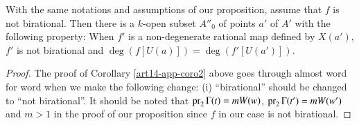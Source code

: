 \begin{corollary}\label{art14-app-coro4}
With the same notations and assumptions of our proposition, assume that $f$ is not birational. Then there is a $k$-open subset $A''_{0}$ of points $a'$ of $A'$ with the following property: When $f'$ is a non-degenerate rational map defined by $X(a')$, $f'$ is not birational and $\deg (f[U(a)])=\deg(f'[U(a')])$.
\end{corollary}

\begin{proof}
The proof of Corollary \ref{art14-app-coro2} above goes through almost word for word when we make the following change: (i) ``birational'' should be changed to ``not birational''. It should be noted that $\operatorname{\mathrm{pr}}_{2}\Gamma(t)=mW(w)$, $\operatorname{\mathrm{pr}}_{2}\Gamma(t')=mW(w')$ and $m>1$ in the proof of our proposition since $f$ in our case is not birational.
\end{proof}

